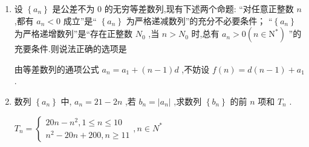 \begin{enumerate}
\begin{jieda}
        因为 $d = {a}_{13} - {a}_{12} < 0$ ,所以等差数列 $\left\{  {a}_{n}\right\}$ 是递减数列,所以 A 错误;
        所以当 $n = {12}$ 时, ${S}_{n}$ 取得最大值,所以 C 错误.
        故选：D
    \end{jieda}
    \item 设 $\left\{  {a}_{n}\right\}$ 是公差不为 0 的无穷等差数列,现有下述两个命题:  “对任意正整数 $n$ ,都有 ${a}_{n} < 0$ 成立”是“ $\left\{  {a}_{n}\right\}$ 为严格递减数列”的充分不必要条件； “$\left\{  {a}_{n}\right\}$ 为严格递增数列”是“存在正整数 ${N}_{0}$ ,当 $n > {N}_{0}$ 时,总有 ${a}_{n} > 0\left( {n \in  {\mathrm{N}}^{ * }}\right)$ ”的充要条件.则说法正确的选项是 
    \begin{jieda}
        由等差数列的通项公式 ${a}_{n} = {a}_{1} + \left( {n - 1}\right) d$ ,不妨设 $f\left( n\right)  = d\left( {n - 1}\right)  + {a}_{1}$ .
    \end{jieda}
    
    \item 数列 $\left\{  {a}_{n}\right\}$ 中, ${a}_{n} = {21} - {2n}$ ,若 ${b}_{n} = \left| {a}_{n}\right|$ ,求数列 $\left\{  {b}_{n}\right\}$ 的前 $n$ 项和 ${T}_{n}$ .
    \begin{jieda}
        ${T}_{n} = \left\{  \begin{array}{l} {20n} - {n}^{2},1 \leq  n \leq  {10} \\  {n}^{2} - {20n} + {200},n \geq  {11} \end{array}\right. ,n \in  {N}^{ * }$
    \end{jieda}
    

\end{enumerate}
